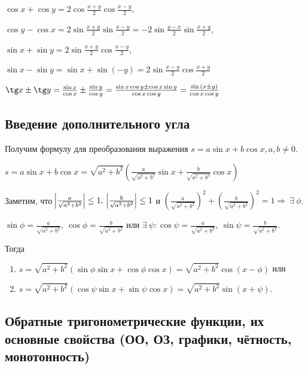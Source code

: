\documentclass{article}
\begin{document}
        \(\cos x + \cos y = 2 \cos{\frac{x + y}{2}} \cos{\frac{x - y}{2}}\),
        
        \(\cos y - \cos x = 2 \sin{\frac{x + y}{2}} \sin{\frac{x - y}{2}} = -2 \sin{\frac{y - x}{2}} \sin{\frac{x + y}{2}}\),
        
        \(\sin x + \sin y = 2 \sin{\frac{x + y}{2}} \cos{\frac{x - y}{2}}\),
        
        \(\sin x - \sin y = \sin x + \sin{(-y)} = 2 \sin{\frac{x - y}{2}} \cos{\frac{x + y}{2}}\)
        
        \(\tg x \pm \tg y = \frac{\sin x}{\cos x} \pm \frac{\sin y}{\cos y} = \frac{\sin x \cos y \pm \cos x \sin y}{\cos x \cos y} = \frac{\sin{(x \pm y)}}{\cos x \cos y}\)
        
        \subsection{Введение дополнительного угла}
        
        Получим формулу для преобразования выражения \(s = a \sin x + b \cos x, a, b \not = 0\).
        
        \(s = a \sin x + b \cos x = \sqrt{a^2 + b^2}(\frac{a}{\sqrt{a^2 + b^2}} \sin x + \frac{b}{\sqrt{a^2 + b^2}} \cos x)\)
        
        Заметим, что \(\abs{\frac{a}{\sqrt{a^2 + b^2}}} \leq 1,\ \abs{\frac{b}{\sqrt{a^2 + b^2}}} \leq 1\) и \((\frac{a}{\sqrt{a^2 + b^2}})^2 + (\frac{b}{\sqrt{a^2 + b^2}})^2 = 1 \Rightarrow\ \exists\ \phi\).
        
        \(\sin{\phi} = \frac{a}{\sqrt{a^2 + b^2}},\ \cos{\phi} = \frac{b}{\sqrt{a^2 + b^2}}\) или \(\exists\ \psi : \cos{\psi} = \frac{a}{\sqrt{a^2 + b^2}},\ \sin{\psi} = \frac{b}{\sqrt{a^2 + b^2}}\).
        
        Тогда \begin{enumerate}
        	\item \(s = \sqrt{a^2 + b^2}(\sin{\phi} \sin x + \cos{\phi} \cos x) = \sqrt{a^2 + b^2} \cos{(x - \phi)}\) или
            \item \(s = \sqrt{a^2 + b^2}(\cos{\psi} \sin x + \sin{\psi} \cos x) = \sqrt{a^2 + b^2} \sin{(x + \psi)}\).
        \end{enumerate}
        
        \subsection{Обратные тригонометрические функции, их основные свойства (ОО, ОЗ, графики, чётность, монотонность)}
        
\end{document}
